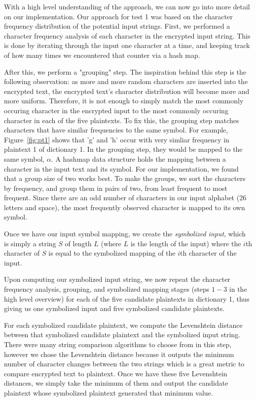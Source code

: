 \documentclass[12pt]{article}
\begin{document}
With a high level understanding of the approach, we can now go into more detail on our implementation. Our approach for test 1 was based on the character frequency distribution of the potential input strings. First, we performed a character frequency analysis of each character in the encrypted input string. This is done by iterating through the input one character at a time, and keeping track of how many times we encountered that counter via a hash map.

After this, we perform a "grouping" step. The inspiration behind this step is the following observation: as more and more random characters are inserted into the encrypted text, the encrypted text's character distribution will become more and more uniform. Therefore, it is not enough to simply match the most commonly occuring character in the encrypted input to the most commonly occuring character in each of the five plaintexts. To fix this, the grouping step matches characters that have similar frequencies to the same symbol. For example, Figure~\ref{fig:pt1} shows that 'g' and 'h' occur with very simliar frequency in plaintext 1 of dictionary 1. In the grouping step, they would be mapped to the same symbol, $\alpha$. A hashmap data structure holds the mapping between a character in the input text and its symbol. For our implementation, we found that a group size of two works best. To make the groups, we sort the characters by frequency, and group them in pairs of two, from least frequent to most frequent. Since there are an odd number of characters in our input alphabet (26 letters and space), the most frequently observed character is mapped to its own symbol.

Once we have our input symbol mapping, we create the \emph{symbolized input}, which is simply a string $S$ of length $L$ (where $L$ is the length of the input) where the $i$th character of $S$ is equal to the symbolized mapping of the $i$th character of the input.

Upon computing our symbolized input string, we now repeat the character frequency analysis, grouping, and symbolized mapping stages (steps $1-3$ in the high level overview) for each of the five candidate plaintexts in dictionary 1, thus giving us one symbolized input and five symbolized candidate plaintexts. 

For each symbolized candidate plaintext, we compute the Levenshtein distance between that symbolized candidate plaintext and the symbolized input string. There were many string comparison algorithms to choose from in this step, however we chose the Levenshtein distance because it outputs the minimum number of character changes between the two strings which is a great metric to compare encrypted text to plaintext. Once we have these five Levenshtein distances, we simply take the minimum of them and output the candidate plaintext whose symbolized plaintext generated that minimum value.
\end{document}
